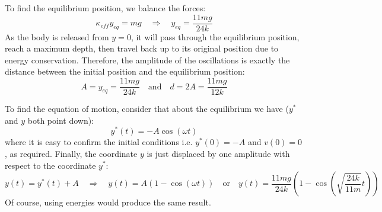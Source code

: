 \begin{minipage}[t][158pt]{\textwidth}
	\vspace{0pt}
	
\begin{minipage}[t][156.6pt]{0.74\textwidth}
	\vspace{2pt}
	To find the equilibrium position, we balance the forces:
	\begin{equation*}
		\kappa_{eff} y_{eq} = mg
		\quad\Rightarrow\quad
		\boxed{y_{eq} = \frac{11mg}{24k}}
		\tag{$6c$}
		\label{eq:j17_p1_6c}
	\end{equation*}
	As the body is released from $y=0$, it will pass through the equilibrium position, reach a maximum depth, then travel back up to its original position due to energy conservation. Therefore, the amplitude of the oscillations is exactly the distance between the initial position and the equilibrium position:
	\begin{equation*}
		\boxed{A = y_{eq} = \frac{11mg}{24k}}
		\quad\text{and}\quad
		\boxed{d = 2A = \frac{11mg}{12k}}
		\tag{$7$}
		\label{eq:j17_p1_7}
	\end{equation*}
\end{minipage}
\end{minipage}
To find the equation of motion, consider that about the equilibrium we have ($y^*$ and $y$ both point down):
\begin{equation*}
	y^*(t) = - A \cos(\omega t)
\end{equation*}
where it is easy to confirm the initial conditions i.e. $y^*(0) = -A$ and $v(0) = 0$, as required. Finally, the coordinate $y$ is just displaced by one amplitude with respect to the coordinate $y^*$:
\begin{equation*}
	y(t) = y^*(t) + A
	\quad\Rightarrow\quad
	\boxed{y(t) = A(1 - \cos(\omega t))}
	\quad\text{or}\quad
	\boxed{y(t) = \frac{11mg}{24k}
		\left(
		1 - \cos\left(\sqrt{\frac{24k}{11m}} t\right)
		\right)}
	\tag{8}
	\label{eq:j17_p1_8}
\end{equation*}
Of course, using energies would produce the same result.
